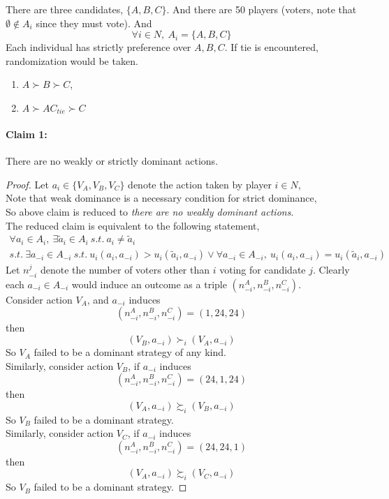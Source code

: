 \documentclass[11pt]{article}
\begin{document}
		\begin{example}
			There are three candidates, $\{A, B, C\}$. And there are 50 players (voters, note that $\emptyset \notin A_i$ since they must vote).
			And 
			\[
				\forall i \in N,\ A_i = \{A, B, C\}
			\]
			Each individual has strictly preference over $A, B, C$. If tie is encountered, randomization would be taken.
			\begin{enumerate}[i]
				\item $A \succ B \succ C$,
				\item $A \succ AC_{tie} \succ C$
			\end{enumerate}
			\paragraph{Claim 1:}There are no weakly or strictly dominant actions. 
			\begin{proof}
				Let $a_i \in \{V_A, V_B, V_C\}$ denote the action taken by player $i \in N$, \\
				Note that weak dominance is a necessary condition for strict dominance, \\
				So above claim is reduced to \emph{there are no weakly dominant actions}. \\
				The reduced claim is equivalent to the following statement, \\
				
				\begin{gather*}
					\forall a_i \in A_i,\ \exists \tilde{a}_i \in A_i\ s.t.\ a_i \neq \tilde{a}_i\\
					s.t.\ \exists a_{-i} \in A_{-i}\ s.t.\ u_i(a_i, a_{-i}) > u_i(\tilde{a}_i, a_{-i}) \lor \forall a_{-i} \in A_{-i},\ u_i(a_i, a_{-i}) = u_i(\tilde{a}_i, a_{-i})
				\end{gather*}
				Let $n_{-i}^j$ denote the number of voters other than $i$ voting for candidate $j$. Clearly each $a_{-i} \in A_{-i}$ would induce an outcome as a triple $(n_{-i}^A, n_{-i}^B, n_{-i}^C)$.\\
				Consider action $V_A$, and $a_{-i}$ induces 
				\[
					(n_{-i}^A, n_{-i}^B, n_{-i}^C) = (1, 24, 24)
				\]
				then 
				\[
					(V_B, a_{-i}) \succ_i (V_A, a_{-i})
				\]
				So $V_A$ failed to be a dominant strategy of any kind. \\
				Similarly, consider action $V_B$, if $a_{-i}$ induces
				\[
					(n_{-i}^A, n_{-i}^B, n_{-i}^C) = (24, 1, 24)
				\]
				then 
				\[
					(V_A, a_{-i}) \succsim_i (V_B, a_{-i})
				\]
				So $V_B$ failed to be a dominant strategy. \\
				Similarly, consider action $V_C$, if $a_{-i}$ induces
				\[
					(n_{-i}^A, n_{-i}^B, n_{-i}^C) = (24, 24, 1)
				\]
				then 
				\[
					(V_A, a_{-i}) \succsim_i (V_C, a_{-i})
				\]
				So $V_B$ failed to be a dominant strategy.
			\end{proof}

\end{example}
\end{document}
